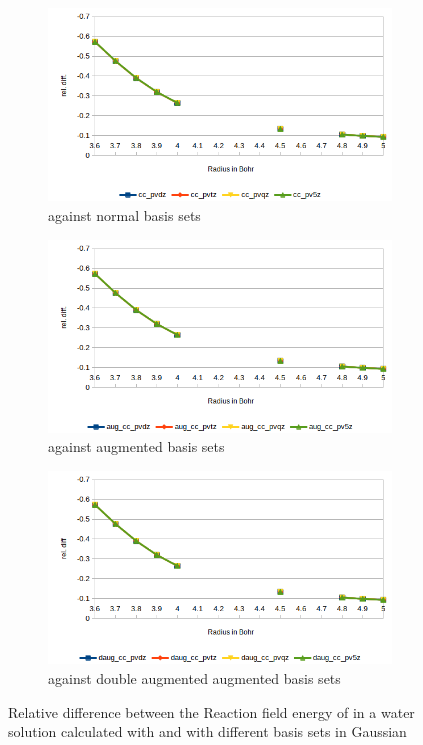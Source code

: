 \documentclass[../Thesis.tex]{subfiles}
\begin{document}
\begin{figure}[h!]
  \centering
  \begin{subfigure}[b]{0.75\linewidth}
    \includegraphics[width=\linewidth]{img/nopreldiff.png}
    \caption{\mrchem against normal basis sets}
  \end{subfigure}
  \begin{subfigure}[b]{0.75\linewidth}
    \includegraphics[width=\linewidth]{img/nopaugreldiff.png}
    \caption{\mrchem against augmented basis sets}
  \end{subfigure}
  \begin{subfigure}[b]{0.75\linewidth}
    \includegraphics[width=\linewidth]{img/nopdaugreldiff.png}
    \caption{\mrchem against double augmented augmented basis sets}
  \end{subfigure}
  \caption[Relative difference between methods for ]{Relative difference between the Reaction field energy of  in a water solution calculated with \mrchem
  and with different basis sets in Gaussian}
  \label{fig:nopreldiff}
\end{figure}
\end{document}
